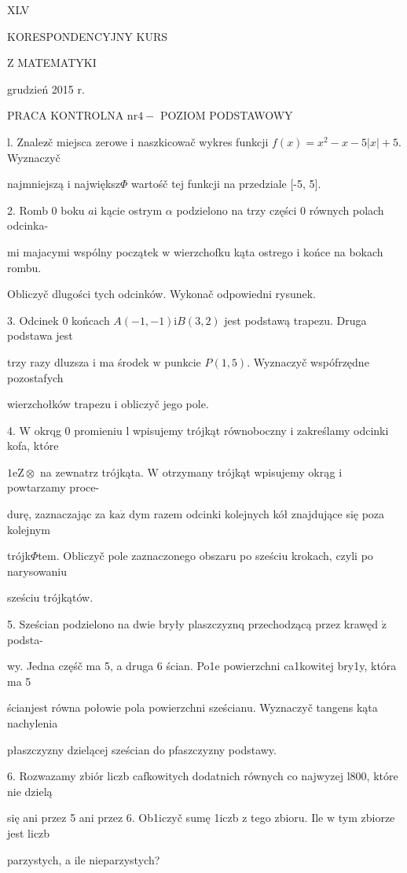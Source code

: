 \documentclass[a4paper,12pt]{article}
\begin{document}
XLV

KORESPONDENCYJNY KURS

Z MATEMATYKI

grudzień 2015 r.

PRACA KONTROLNA $\mathrm{n}\mathrm{r} 4-$ POZIOM PODSTAWOWY

l. Znalez$\acute{}$č miejsca zerowe $\mathrm{i}$ naszkicowač wykres funkcji $f(x)=x^{2}-x-5|x|+5$. Wyznaczyč

najmniejszą $\mathrm{i}$ największ$\Phi$ wartośč tej funkcji na przedziale [-5, 5].

2. Romb $0$ boku $a\mathrm{i}$ kącie ostrym $\alpha$ podzielono na trzy części $0$ równych polach odcinka-

mi majacymi wspólny początek $\mathrm{w}$ wierzchofku kąta ostrego $\mathrm{i}$ końce na bokach rombu.

Obliczyč dlugości tych odcinków. Wykonač odpowiedni rysunek.

3. Odcinek $0$ końcach $A(-1,-1) \mathrm{i} B(3,2)$ jest podstawą trapezu. Druga podstawa jest

trzy razy dluzsza $\mathrm{i}$ ma środek $\mathrm{w}$ punkcie $P(1,5)$. Wyznaczyč wspófrzędne pozostafych

wierzchołków trapezu $\mathrm{i}$ obliczyč jego pole.

4. $\mathrm{W}$ okrqg $0$ promieniu l wpisujemy trójkąt równoboczny $\mathrm{i}$ zakreślamy odcinki kofa, które

$ 1\mathrm{e}\mathrm{Z}\otimes$ na zewnatrz trójkąta. $\mathrm{W}$ otrzymany trójkąt wpisujemy okrąg $\mathrm{i}$ powtarzamy proce-

durę, zaznaczając za $\mathrm{k}\mathrm{a}\dot{\mathrm{z}}$ dym razem odcinki kolejnych kół znajdujące się poza kolejnym

trójk$\Phi$tem. Obliczyč pole zaznaczonego obszaru po sześciu krokach, czyli po narysowaniu

sześciu trójkątów.

5. Sześcian podzielono na dwie bryły plaszczyznq przechodzącą przez krawęd $\acute{\mathrm{z}}$ podsta-

wy. Jedna częśč ma 5, a druga 6 ścian. Po1e powierzchni ca1kowitej bry1y, która ma 5

ścianjest równa połowie pola powierzchni sześcianu. Wyznaczyč tangens kąta nachylenia

płaszczyzny dzielącej sześcian do pfaszczyzny podstawy.

6. Rozwazamy zbiór liczb cafkowitych dodatnich równych co najwyzej l800, które nie dzielą

się ani przez 5 ani przez 6. Ob1iczyč sumę 1iczb $\mathrm{z}$ tego zbioru. Ile $\mathrm{w}$ tym zbiorze jest liczb

parzystych, a ile nieparzystych?
\end{document}
